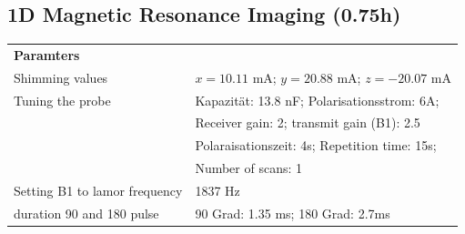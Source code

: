     \subsection{1D Magnetic Resonance Imaging (0.75h)}



    \begin{tabular}{ll}

        \textbf{Paramters} &            \\
        
        Shimming values & $x = 10.11$ mA; $y = 20.88$ mA; $z = −20.07$ mA \\
        
        Tuning the probe & Kapazität: 13.8 nF; Polarisationsstrom: 6A;\\
        & Receiver gain: 2; transmit gain (B1): 2.5\\
        & Polaraisationszeit: 4s; Repetition time: 15s; \\
        & Number of scans: 1\\
        
        Setting B1 to lamor frequency &    1837 Hz \\
        
        duration 90 and 180 pulse & 90 Grad: 1.35 ms; 180 Grad: 2.7ms \\
        \end{tabular}  
        
        \vspace{1cm}

